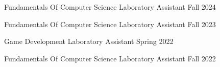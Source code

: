 


\begin{cvhonors}
  \cvhonor
    {Fundamentals Of Computer Science} {Laboratory Assistant}  {} {Fall 2024} 
    

  \cvhonor
    {Fundamentals Of Computer Science} %
    {Laboratory Assistant} %
    {} %
    {Fall 2023} %
    
  \cvhonor
    {Game Development} %
    {Laboratory Assistant} %
    {} %
    {Spring 2022} %
    
  \cvhonor
    {Fundamentals Of Computer Science} %
    {Laboratory Assistant} %
    {} %
    {Fall 2022} %
    
\end{cvhonors}
